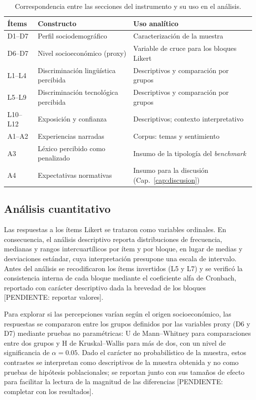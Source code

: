 \begin{table}[H]
  \centering
  \caption[Correspondencia entre instrumento y plan de análisis.]{Correspondencia
  entre las secciones del instrumento y su uso en el análisis.}
  \label{tab:instrumento-analisis}
  \begin{tabular}{llp{6.2cm}}
    \toprule
    \textbf{Ítems} & \textbf{Constructo} & \textbf{Uso analítico} \\
    \midrule
    D1--D7   & Perfil sociodemográfico & Caracterización de la muestra \\
    D6--D7   & Nivel socioeconómico (proxy) & Variable de cruce para los bloques Likert \\
    L1--L4   & Discriminación lingüística percibida & Descriptivos y comparación por grupos \\
    L5--L9   & Discriminación tecnológica percibida & Descriptivos y comparación por grupos \\
    L10--L12 & Exposición y confianza & Descriptivos; contexto interpretativo \\
    A1--A2   & Experiencias narradas & Corpus: temas y sentimiento \\
    A3       & Léxico percibido como penalizado & Insumo de la tipología del \emph{benchmark} \\
    A4       & Expectativas normativas & Insumo para la discusión (Cap.~\ref{cap:discusion}) \\
    \bottomrule
  \end{tabular}
\end{table}

\subsection{Análisis cuantitativo}
\label{sec:analisis-cuantitativo}

Las respuestas a los ítems Likert se trataron como variables ordinales. En
consecuencia, el análisis descriptivo reporta distribuciones de frecuencia,
medianas y rangos intercuartílicos por ítem y por bloque, en lugar de medias y
desviaciones estándar, cuya interpretación presupone una escala de intervalo.
Antes del análisis se recodificaron los ítems invertidos (L5 y L7) y se
verificó la consistencia interna de cada bloque mediante el coeficiente alfa
de Cronbach, reportado con carácter descriptivo dada la brevedad de los
bloques [PENDIENTE: reportar valores].

Para explorar si las percepciones varían según el origen socioeconómico, las
respuestas se compararon entre los grupos definidos por las variables proxy
(D6 y D7) mediante pruebas no paramétricas: U de Mann--Whitney para
comparaciones entre dos grupos y H de Kruskal--Wallis para más de dos, con un
nivel de significancia de $\alpha = 0.05$. Dado el carácter no probabilístico
de la muestra, estos contrastes se interpretan como descriptivos de la muestra
obtenida y no como pruebas de hipótesis poblacionales; se reportan junto con
sus tamaños de efecto para facilitar la lectura de la magnitud de las
diferencias [PENDIENTE: completar con los resultados].

